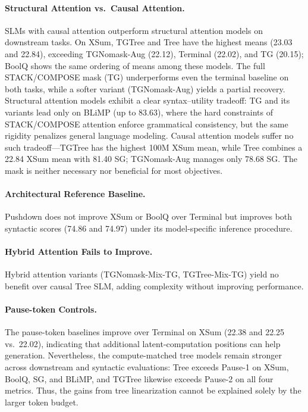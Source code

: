 \documentclass[11pt]{article}
\begin{document}
\paragraph{Structural Attention vs.\ Causal Attention.}
SLMs with causal attention outperform structural attention models on downstream tasks.
On XSum, TGTree and Tree have the highest means (23.03 and 22.84), exceeding TGNomask-Aug (22.12), Terminal (22.02), and TG (20.15); BoolQ shows the same ordering of means among these models.
The full STACK/COMPOSE mask (TG) underperforms even the terminal baseline on both tasks, while a softer variant (TGNomask-Aug) yields a partial recovery.
Structural attention models exhibit a clear syntax--utility tradeoff: TG and its variants lead only on BLiMP (up to 83.63), where the hard constraints of STACK/COMPOSE attention enforce grammatical consistency, but the same rigidity penalizes general language modeling.
Causal attention models suffer no such tradeoff---TGTree has the highest 100M XSum mean, while Tree combines a 22.84 XSum mean with 81.40 SG; TGNomask-Aug manages only 78.68 SG.
The mask is neither necessary nor beneficial for most objectives. %

\paragraph{Architectural Reference Baseline.}
Pushdown does not improve XSum or BoolQ over Terminal but improves both syntactic scores (74.86 and 74.97) under its model-specific inference procedure.

\paragraph{Hybrid Attention Fails to Improve.}
Hybrid attention variants (TGNomask-Mix-TG, TGTree-Mix-TG) yield no benefit over causal Tree SLM, adding complexity without improving performance.

\paragraph{Pause-token Controls.}
The pause-token baselines improve over Terminal on XSum (22.38 and 22.25 vs.\ 22.02), indicating that additional latent-computation positions can help generation.
Nevertheless, the compute-matched tree models remain stronger across downstream and syntactic evaluations: Tree exceeds Pause-1 on XSum, BoolQ, SG, and BLiMP, and TGTree likewise exceeds Pause-2 on all four metrics.
Thus, the gains from tree linearization cannot be explained solely by the larger token budget.
\end{document}
